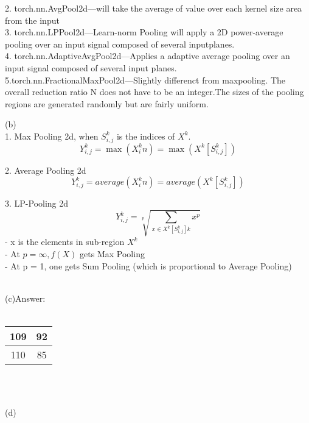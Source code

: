 \documentclass{article}
\begin{document}
2. torch.nn.AvgPool2d---will take the average of value over each kernel size  area from the input \\

3. torch.nn.LPPool2d---Learn-norm Pooling will apply a 2D power-average pooling over an input signal composed of several inputplanes.\\

4. torch.nn.AdaptiveAvgPool2d---Applies a adaptive average pooling over an input signal composed of several input planes.\\

5.torch.nn.FractionalMaxPool2d---Slightly differenct from maxpooling. The overall reduction ratio N does not have to be an integer.The sizes of the pooling regions are generated randomly but are fairly uniform.


\item  (b)
\\
1. Max Pooling 2d, when $S^k_{i,j}$ is the indices of $X^k$.
\begin{equation}
    Y^k_{i,j}  = \max(X^k_in)=\max (X^k[S^k_{i,j}])
\end{equation}

2. Average Pooling 2d
\begin{equation}
    Y^k_{i,j}  = average(X^k_in) = average(X^k[S^k_{i,j}])
\end{equation}

3. LP-Pooling 2d
\begin{equation}
        Y^k_{i,j} = \sqrt[p]{\sum_{x \in X^k[S^k_{i,j}]k} x^{p}}
\end{equation}
- x is the elements in sub-region $X^k$\\
- At $p = \infty, f(X)$ gets Max Pooling\\
- At p = 1, one gets Sum Pooling (which is proportional to Average Pooling)
\\\\
\item  (c)Answer:
\\\\
\begin{tabular}{|c |c|}
     \hline
      109	& 92 \\
      \hline
       110	& 85\\
        \hline
\end{tabular}
\\\\
\item  (d)
\end{document}
